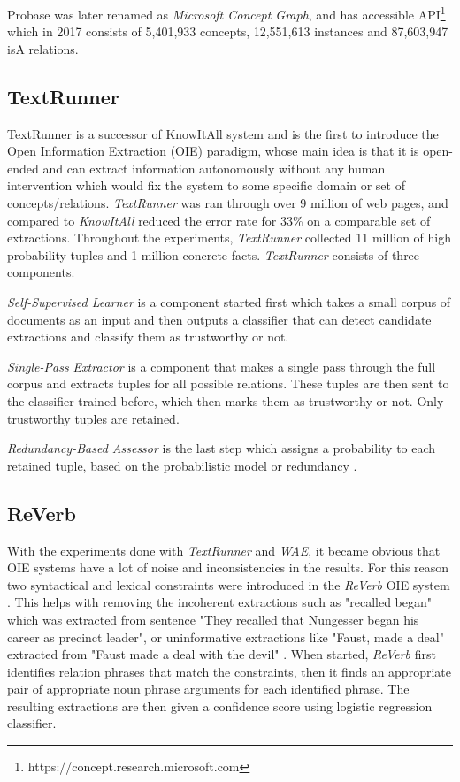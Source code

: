 Probase was later renamed as \emph{Microsoft Concept Graph}, and has accessible
API\footnote{https://concept.research.microsoft.com} which in 2017 consists of
5,401,933 concepts, 12,551,613 instances and 87,603,947 isA relations. 

\subsection {TextRunner}
\label{section:r:textrunner}
TextRunner is a successor of KnowItAll system \parencite{Soderland2007} and is
the first to introduce the Open Information Extraction (OIE) paradigm, whose main idea is that it is open-ended and can extract information autonomously without
any human intervention which would fix the system to some specific domain or set
of concepts/relations.
\emph{TextRunner} was ran through over 9 million of web pages, and compared to
\emph{KnowItAll} reduced the error rate for 33\% on a comparable set of 
extractions. Throughout the experiments, \emph{TextRunner} collected 11 million
of high probability tuples and 1 million concrete facts. \emph{TextRunner} 
consists of three components.

\emph{Self-Supervised Learner} is a component started first which takes a small
corpus of documents as an input and then outputs a classifier that can detect
candidate extractions and classify them as trustworthy or not.

\emph{Single-Pass Extractor} is a component that makes a single pass through
the full corpus and extracts tuples for all possible relations. These tuples
are then sent to the classifier trained before, which then marks them as
trustworthy or not. Only trustworthy tuples are retained.

\emph{Redundancy-Based Assessor} is the last step which assigns a probability to
each retained tuple, based on the probabilistic model or redundancy
\parencite{Downey2005}.

\subsection{ReVerb}
\label{section:r:reverb}
With  the experiments done with \emph{TextRunner} and \emph{WAE}, it became
obvious that OIE systems have a lot of noise and inconsistencies in the results.
For this reason two syntactical and lexical constraints were introduced in the \emph{ReVerb} OIE system \parencite{Fader2011}. This helps with removing
the incoherent extractions such as "recalled began" which was extracted from
sentence "They recalled that Nungesser began his career as precinct leader", or
uninformative extractions like "Faust, made a deal" extracted from "Faust
made a deal with the devil" \parencite{Fader2011}.
When started, \emph{ReVerb} first identifies relation phrases that match the
constraints, then it finds an appropriate pair of appropriate noun phrase arguments
for each identified phrase. The resulting extractions are then given a 
confidence score using logistic regression classifier.

